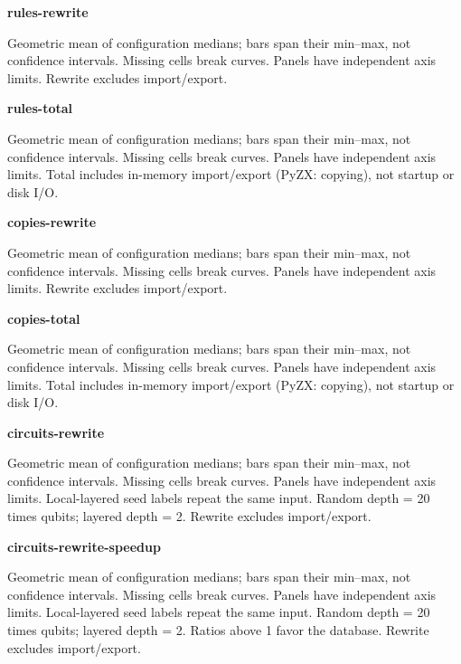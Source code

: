 \documentclass{article}
\begin{document}
\begin{center}
\textbf{rules-rewrite}\par\medskip

\end{center}
Geometric mean of configuration medians; bars span their min--max, not confidence intervals. Missing cells break curves. Panels have independent axis limits. Rewrite excludes import/export.
\clearpage
\begin{center}
\textbf{rules-total}\par\medskip

\end{center}
Geometric mean of configuration medians; bars span their min--max, not confidence intervals. Missing cells break curves. Panels have independent axis limits. Total includes in-memory import/export (PyZX: copying), not startup or disk I/O.
\clearpage
\begin{center}
\textbf{copies-rewrite}\par\medskip

\end{center}
Geometric mean of configuration medians; bars span their min--max, not confidence intervals. Missing cells break curves. Panels have independent axis limits. Rewrite excludes import/export.
\clearpage
\begin{center}
\textbf{copies-total}\par\medskip

\end{center}
Geometric mean of configuration medians; bars span their min--max, not confidence intervals. Missing cells break curves. Panels have independent axis limits. Total includes in-memory import/export (PyZX: copying), not startup or disk I/O.
\clearpage
\begin{center}
\textbf{circuits-rewrite}\par\medskip

\end{center}
Geometric mean of configuration medians; bars span their min--max, not confidence intervals. Missing cells break curves. Panels have independent axis limits. Local-layered seed labels repeat the same input. Random depth = 20 times qubits; layered depth = 2. Rewrite excludes import/export.
\clearpage
\begin{center}
\textbf{circuits-rewrite-speedup}\par\medskip

\end{center}
Geometric mean of configuration medians; bars span their min--max, not confidence intervals. Missing cells break curves. Panels have independent axis limits. Local-layered seed labels repeat the same input. Random depth = 20 times qubits; layered depth = 2. Ratios above 1 favor the database. Rewrite excludes import/export.
\end{document}
